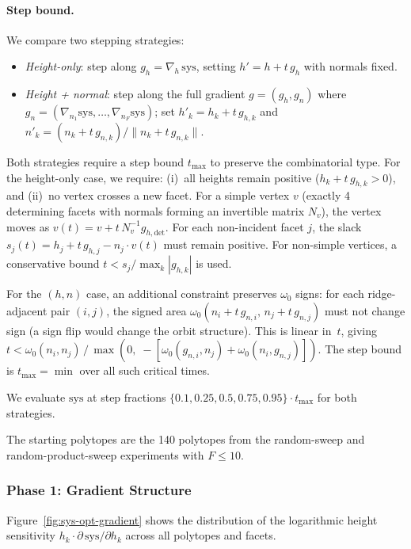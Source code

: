 \paragraph{Step bound.}
We compare two stepping strategies:
\begin{itemize}
\item \emph{Height-only}: step along $g_h = \nabla_h\,\mathrm{sys}$,
  setting $h' = h + t\,g_h$ with normals fixed.
\item \emph{Height + normal}: step along the full gradient
  $g = (g_h, g_n)$ where
  $g_n = (\nabla_{n_1}\mathrm{sys},\dots,\nabla_{n_F}\mathrm{sys})$;
  set $h'_k = h_k + t\,g_{h,k}$ and
  $n'_k = (n_k + t\,g_{n,k}) / \|n_k + t\,g_{n,k}\|$.
\end{itemize}

Both strategies require a step bound $t_{\max}$ to preserve the combinatorial type.
For the height-only case, we require:
(i)~all heights remain positive ($h_k + t\,g_{h,k} > 0$), and
(ii)~no vertex crosses a new facet.
For a simple vertex $v$ (exactly 4 determining facets with normals
forming an invertible matrix $N_v$), the vertex moves as
$v(t) = v + t\,N_v^{-1}g_{h,\mathrm{det}}$.
For each non-incident facet $j$, the slack $s_j(t) = h_j + t\,g_{h,j} - n_j \cdot v(t)$
must remain positive.
For non-simple vertices, a conservative bound $t < s_j / \max_k |g_{h,k}|$ is used.

For the $(h,n)$ case, an additional constraint preserves $\omega_0$
signs: for each ridge-adjacent pair $(i,j)$, the signed area
$\omega_0(n_i + t\,g_{n,i},\, n_j + t\,g_{n,j})$
must not change sign (a sign flip would change the orbit structure).
This is linear in~$t$, giving
$t < \omega_0(n_i,n_j)\,/\,\max(0,\;-[\omega_0(g_{n,i},n_j) + \omega_0(n_i,g_{n,j})])$.
The step bound is $t_{\max} = \min$ over all such critical times.

We evaluate $\mathrm{sys}$ at step fractions
$\{0.1, 0.25, 0.5, 0.75, 0.95\} \cdot t_{\max}$ for both strategies.

The starting polytopes are the 140 polytopes from the random-sweep and
random-product-sweep experiments with $F \le 10$.

\subsubsection*{Phase 1: Gradient Structure}

Figure~\ref{fig:sys-opt-gradient} shows the distribution of the
logarithmic height sensitivity
$h_k \cdot \partial\,\mathrm{sys}/\partial h_k$
across all polytopes and facets.

